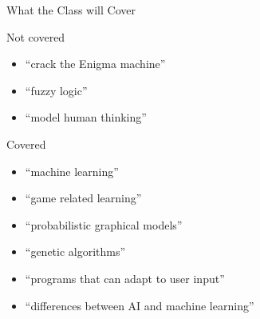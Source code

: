 \documentclass[14pt]{beamer}
\begin{document}
\begin{frame}{What the Class will Cover}
\begin{block}{Not covered}
\begin{itemize}
\item ``crack the Enigma machine''
\item ``fuzzy logic''
\item ``model human thinking''
\end{itemize}
\end{block}
\begin{block}{Covered}
\begin{itemize}
\item ``machine learning''
\item ``game related learning''
\item ``probabilistic graphical models''
\item ``genetic algorithms''
\item ``programs that can adapt to user input''
\item ``differences between AI and machine learning''
\end{itemize}
\end{block}
\end{frame}
\end{document}
